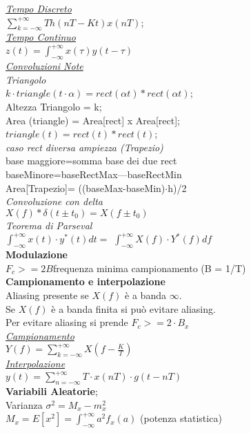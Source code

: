 \documentclass[a4paper]{article}
\begin{document}
\begin{multicols*}{3}
\underline{\textit{Tempo Discreto}} \\
$\sum_{k=-\infty}^{+\infty}{Th(nT-Kt)x(nT)}$; \\
\underline{\textit{Tempo Continuo}} \\
$z (t)=\int_{-\infty}^{+\infty}{x(\tau)y(t-\tau)}$\\
\underline{\textit{Convoluzioni Note}} \\
\textit{Triangolo }\\
$k\cdot triangle(t\cdot \alpha) = rect(\alpha t) * rect(\alpha t)$; \\
Altezza Triangolo = k; \\
Area (triangle) = Area[rect] x Area[rect]; \\ 
$triangle(t) = rect(t) * rect(t)$; \\
\textit{caso rect diversa ampiezza (Trapezio)} \\
base maggiore=somma base dei due rect\\
baseMinore=baseRectMax---baseRectMin\\
Area[Trapezio]= ((baseMax-baseMin)$\cdot$h)/2\\
\textit{Convoluzione con delta} \\
$X(f)*\delta(t \pm t_0)=X(f\pm t_0)$ \\ 
\textit{Teorema di Parseval }\\
$\int_{-\infty}^{+\infty}{x(t)\cdot y^*(t)dt = }$ 
$\int_{-\infty}^{+\infty}{X(f)\cdot Y^*(f)df}$ \\
\textbf{Modulazione} \\
$F_c>=2B$frequenza minima campionamento (B = 1/T)\\
\textbf{Campionamento e interpolazione} \\
Aliasing presente se $X(f)$ è a banda $\infty$. \\
Se $X(f)$ è a banda finita si può evitare aliasing.\\
Per evitare aliasing si prende $F_c >= 2\cdot B_x$ \\
\underline{\textit{Campionamento}}\\
$Y(f)=\sum_{k=-\infty}^{+\infty}{X(f-\frac{K}{T})}$ \\
\underline{\textit{Interpolazione}}\\
$y(t)=\sum_{n=-\infty}^{+\infty}{T\cdot x(nT)\cdot g(t-nT)}$ \\
\textbf{Variabili Aleatorie}; \\
Varianza $\sigma^2=M_x-m_x^2$ \\
$M_x=E[x^2]=\int_{-\infty}^{+\infty} a^2 f_x(a)$ (potenza statistica) 

\end{multicols*}
\end{document}
